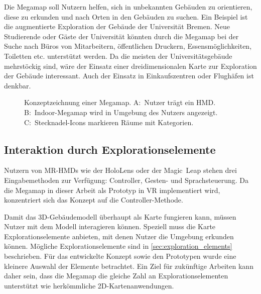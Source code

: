 Die Megamap soll Nutzern helfen, sich in unbekannten Gebäuden zu orientieren, diese zu erkunden und nach Orten in den Gebäuden zu suchen.
Ein Beispiel ist die augmentierte Exploration der Gebäude der Universität Bremen.
Neue Studierende oder Gäste der Universität könnten durch die Megamap bei der Suche nach Büros von Mitarbeitern, öffentlichen Druckern, Essensmöglichkeiten, Toiletten etc. unterstützt werden.
Da die meisten der Universitätsgebäude mehrstöckig sind, wäre der Einsatz einer dreidimensionalen Karte zur Exploration der Gebäude interessant.
Auch der Einsatz in Einkaufszentren oder Flughäfen ist denkbar.
\begin{figure}[bht]
	\centering
	\caption{Konzeptzeichnung einer Megamap. %
		A:~Nutzer trägt ein HMD. %
		B:~Indoor-Megamap wird in Umgebung des Nutzers angezeigt. %
		C:~Stecknadel-Icons markieren Räume mit Kategorien.}
	\label{fig:concept_overview}
\end{figure}

\subsection{Interaktion durch Explorationselemente}
Nutzern von MR-HMDs wie der HoloLens oder der Magic~Leap stehen drei Eingabemethoden zur Verfügung: Controller, Gesten- und Sprachsteuerung.
Da die Megamap in dieser Arbeit als Prototyp in VR implementiert wird, konzentriert sich das Konzept auf die Controller-Methode.

Damit das 3D-Gebäudemodell überhaupt als Karte fungieren kann, müssen Nutzer mit dem Modell interagieren können.
Speziell muss die Karte Explorationselemente anbieten, mit denen Nutzer die Umgebung erkunden können.
Mögliche Explorationselemente sind in \autoref{sec:exploration_elements} beschrieben.
Für das entwickelte Konzept sowie den Prototypen wurde eine kleinere Auswahl der Elemente betrachtet.
Ein Ziel für zukünftige Arbeiten kann daher sein, dass die Megamap die gleiche Zahl an Explorationselementen unterstützt wie herkömmliche 2D-Kartenanwendungen.

